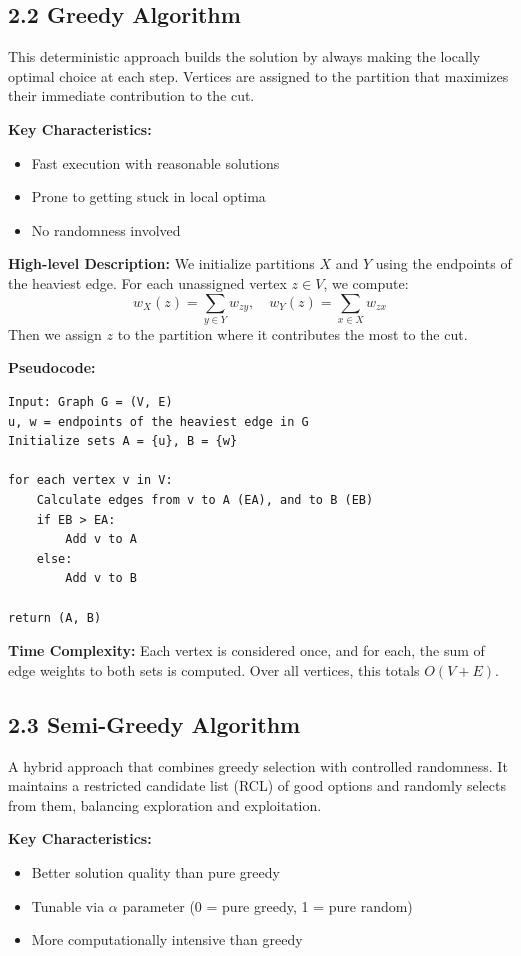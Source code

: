 \documentclass[11pt]{article}
\begin{document}
\subsection*{2.2 Greedy Algorithm}
This deterministic approach builds the solution by always making the locally optimal choice at each step. Vertices are assigned to the partition that maximizes their immediate contribution to the cut.

\textbf{Key Characteristics:}
\begin{itemize}
\item Fast execution with reasonable solutions
\item Prone to getting stuck in local optima
\item No randomness involved
\end{itemize}

\textbf{High-level Description:}
We initialize partitions $X$ and $Y$ using the endpoints of the heaviest edge. For each unassigned vertex $z \in V$, we compute:
\[ w_X(z) = \sum_{y \in Y} w_{zy}, \quad w_Y(z) = \sum_{x \in X} w_{zx} \]
Then we assign $z$ to the partition where it contributes the most to the cut.

\textbf{Pseudocode:}
\begin{verbatim}
Input: Graph G = (V, E)
u, w = endpoints of the heaviest edge in G
Initialize sets A = {u}, B = {w}

for each vertex v in V:
    Calculate edges from v to A (EA), and to B (EB)
    if EB > EA:
        Add v to A
    else:
        Add v to B

return (A, B)
\end{verbatim}

\textbf{Time Complexity:} Each vertex is considered once, and for each, the sum of edge weights to both sets is computed. Over all vertices, this totals $O(V+E)$.

\subsection*{2.3 Semi-Greedy Algorithm}
A hybrid approach that combines greedy selection with controlled randomness. It maintains a restricted candidate list (RCL) of good options and randomly selects from them, balancing exploration and exploitation.

\textbf{Key Characteristics:}
\begin{itemize}
\item Better solution quality than pure greedy
\item Tunable via $\alpha$ parameter (0 = pure greedy, 1 = pure random)
\item More computationally intensive than greedy
\end{itemize}
\end{document}
